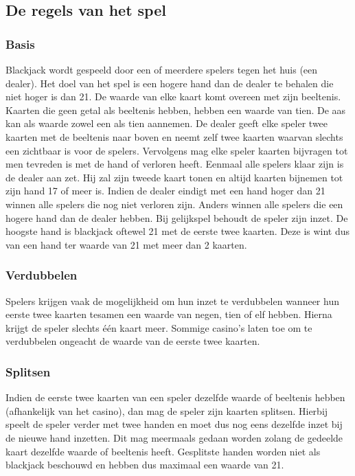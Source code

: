 \documentclass[conference]{IEEEtran}
\begin{document}
\subsection{De regels van het spel}

\subsubsection{Basis}
Blackjack wordt gespeeld door een of meerdere spelers tegen het huis (een dealer). Het doel van het spel is een hogere hand dan de dealer te behalen die niet hoger is dan 21. De waarde van elke kaart komt overeen met zijn beeltenis. Kaarten die geen getal als beeltenis hebben, hebben een waarde van tien. De aas kan als waarde zowel een als tien aannemen. De dealer geeft elke speler twee kaarten met de beeltenis naar boven en neemt zelf twee kaarten waarvan slechts een zichtbaar is voor de spelers. Vervolgens mag elke speler kaarten bijvragen tot men tevreden is met de hand of verloren heeft. Eenmaal alle spelers klaar zijn is de dealer aan zet. Hij zal zijn tweede kaart tonen en altijd kaarten bijnemen tot zijn hand 17 of meer is. Indien de dealer eindigt met een hand hoger dan 21 winnen alle spelers die nog niet verloren zijn. Anders winnen alle spelers die een hogere hand dan de dealer hebben. Bij gelijkspel behoudt de speler zijn inzet. De hoogste hand is blackjack oftewel 21 met de eerste twee kaarten. Deze is wint dus van een hand ter waarde van 21 met meer dan 2 kaarten.

\subsubsection{Verdubbelen}
Spelers krijgen vaak de mogelijkheid om hun inzet te verdubbelen wanneer hun eerste twee kaarten tesamen een waarde van negen, tien of elf hebben. Hierna krijgt de speler slechts één kaart meer. Sommige casino's laten toe om te verdubbelen ongeacht de waarde van de eerste twee kaarten.

\subsubsection{Splitsen}
Indien de eerste twee kaarten van een speler dezelfde waarde of beeltenis hebben (afhankelijk van het casino), dan mag de speler zijn kaarten splitsen. Hierbij speelt de speler verder met twee handen en moet dus nog eens dezelfde inzet bij de nieuwe hand inzetten. Dit mag meermaals gedaan worden zolang de gedeelde kaart dezelfde waarde of beeltenis heeft. Gesplitste handen worden niet als blackjack beschouwd en hebben dus maximaal een waarde van 21.
\end{document}
